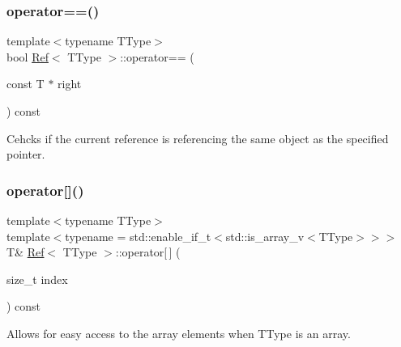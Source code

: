 \mbox{\label{class_ref_ac33d6085174ef867bb4cea065a432ff5}} 
\subsubsection{\texorpdfstring{operator==()}{operator==()}\hspace{0.1cm}{\footnotesize\ttfamily [3/3]}}
{\footnotesize\ttfamily template$<$typename T\+Type$>$ \\
bool \mbox{\hyperlink{class_ref}{Ref}}$<$ T\+Type $>$\+::operator== (\begin{DoxyParamCaption}\item[{const T $\ast$}]{right }\end{DoxyParamCaption}) const\hspace{0.3cm}{\ttfamily [inline]}}



Cehcks if the current reference is referencing the same object as the specified pointer. 

\mbox{\label{class_ref_af44580a655b72ebbae930b3056f85277}} 
\subsubsection{\texorpdfstring{operator[]()}{operator[]()}}
{\footnotesize\ttfamily template$<$typename T\+Type$>$ \\
template$<$typename  = std\+::enable\+\_\+if\+\_\+t$<$std\+::is\+\_\+array\+\_\+v$<$\+T\+Type$>$$>$$>$ \\
T\& \mbox{\hyperlink{class_ref}{Ref}}$<$ T\+Type $>$\+::operator\mbox{[}$\,$\mbox{]} (\begin{DoxyParamCaption}\item[{size\+\_\+t}]{index }\end{DoxyParamCaption}) const\hspace{0.3cm}{\ttfamily [inline]}}



Allows for easy access to the array elements when T\+Type is an array. 

\mbox{\label{class_ref_a0dff788348708e8d176d3154d15f4e3a}} 
